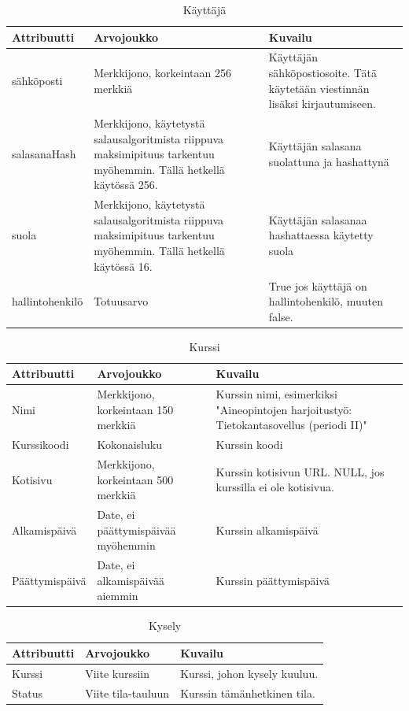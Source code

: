 \documentclass[12pt,a4paper,titlepage]{article}
\begin{document}
\begin{table}[h!]
\caption{Käyttäjä} \label{tietokohde_ensimmainen}
\begin{tabularx}{\textwidth}{ | l X X |}
  \hline
  Attribuutti & Arvojoukko & Kuvailu \\
  \hline
  sähköposti & Merkkijono, korkeintaan 256 merkkiä & Käyttäjän sähköpostiosoite. Tätä käytetään viestinnän lisäksi kirjautumiseen. \\
  salasanaHash & Merkkijono, käytetystä salausalgoritmista riippuva maksimipituus tarkentuu myöhemmin. Tällä hetkellä käytössä 256. & Käyttäjän salasana suolattuna ja hashattynä\\
  suola & Merkkijono, käytetystä salausalgoritmista riippuva maksimipituus tarkentuu myöhemmin. Tällä hetkellä käytössä 16. & Käyttäjän salasanaa hashattaessa käytetty suola \\
  hallintohenkilö & Totuusarvo & True jos käyttäjä on hallintohenkilö, muuten false. \\
  \hline
\end{tabularx}
\end{table}

\begin{table}[h!]
\caption{Kurssi}
\begin{tabularx}{\textwidth}{ |  l X X  |}
  \hline
  Attribuutti & Arvojoukko & Kuvailu \\
  \hline
  Nimi & Merkkijono, korkeintaan 150 merkkiä & Kurssin nimi, esimerkiksi "Aineopintojen harjoitustyö: Tietokantasovellus (periodi II)" \\
  Kurssikoodi & Kokonaisluku & Kurssin koodi \\
  Kotisivu & Merkkijono, korkeintaan 500 merkkiä & Kurssin kotisivun URL. NULL, jos kurssilla ei ole kotisivua. \\
  Alkamispäivä & Date, ei päättymispäivää myöhemmin & Kurssin alkamispäivä \\
  Päättymispäivä & Date, ei alkamispäivää aiemmin & Kurssin päättymispäivä \\
  \hline
\end{tabularx}
\end{table}

\begin{table}[h!]
\caption{Kysely}
\begin{tabularx}{\textwidth}{ |  l X X  |}
  \hline
  Attribuutti & Arvojoukko & Kuvailu \\
  \hline
  Kurssi & Viite kurssiin & Kurssi, johon kysely kuuluu. \\
  Status & Viite tila-tauluun & Kurssin tämänhetkinen tila. \\
  \hline
\end{tabularx}
\end{table}
\end{document}
